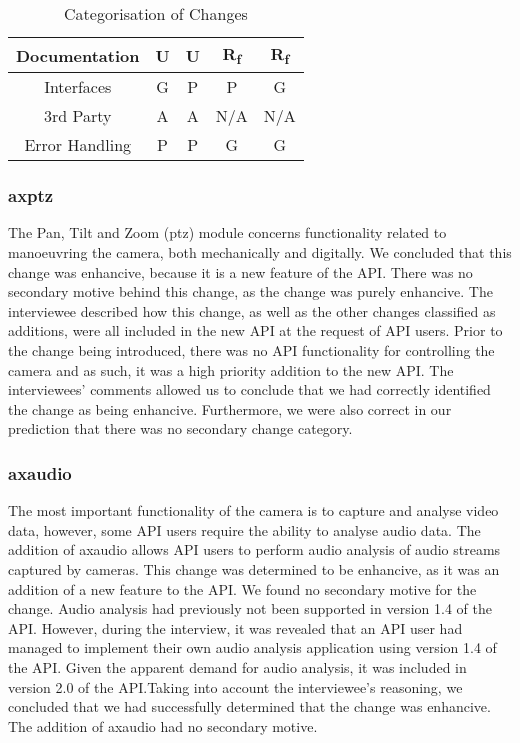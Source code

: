 \documentclass{sig-alternate}
\begin{document}
\begin{table}
\begin{tabular}[ht]{c !{\vrule width 1.5pt} c|c !{\vrule width 1.5pt} c|c}
              Documentation        & U                         & U                         & R\textsubscript{f}        & R\textsubscript{f} \\ \hline
              Interfaces           & G                         & P                         & P                         & G                  \\ \hline
              3rd Party            & A                         & A                         & N/A                       & N/A                \\ \hline
              Error Handling       & P                         & P                         & G                         & G                  \\ 

              \bottomrule
       \end{tabular}
       \caption{Categorisation of Changes }
       \label{table:categories}
\end{table}



\subsubsection{axptz} %
The Pan, Tilt and Zoom (ptz) module concerns functionality related to manoeuvring the camera, both mechanically and digitally. We concluded that this change was enhancive, because it is a new feature of the API. There was no secondary motive behind this change, as the change was purely enhancive. The interviewee described how this change, as well as the other changes classified as additions, were all included in the new API at the request of API users. Prior to the change being introduced, there was no API functionality for controlling the camera and as such, it was a high priority addition to the new API. The interviewees' comments allowed us to conclude that we had correctly identified the change as being enhancive. Furthermore, we were also correct in our prediction that there was no secondary change category. 

\subsubsection{axaudio} %
The most important functionality of the camera is to capture and analyse video data, however, some API users require the ability to analyse audio data. The addition of axaudio allows API users to perform audio analysis of audio streams captured by cameras. This change was determined to be enhancive, as it was an addition of a new feature to the API. We found no secondary motive for the change. Audio analysis had previously not been supported in version 1.4 of the API. However, during the interview, it was revealed that an API user had managed to implement their own audio analysis application using version 1.4 of the API. Given the apparent demand for audio analysis, it was included in version 2.0 of the API.Taking into account the interviewee's reasoning, we concluded that we had successfully determined that the change was enhancive. The addition of axaudio had no secondary motive. 
\end{document}
